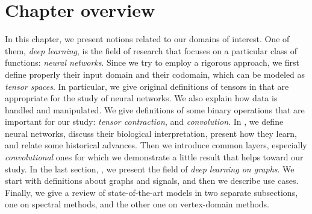 \section*{Chapter overview}

In this chapter, we present notions related to our domains of interest. One of them, \emph{deep learning}, is the field of research that focuses on a particular class of functions: \emph{neural networks}. Since we try to employ a rigorous approach, we first define properly their input domain and their codomain, which can be modeled as \emph{tensor spaces}. In particular, we give original definitions of tensors in  that are appropriate for the study of neural networks. We also explain how data is handled and manipulated. We give definitions of some binary operations that are important for our study: \emph{tensor contraction}, and \emph{convolution}. In , we define neural networks, discuss their biological interpretation, present how they learn, and relate some historical advances. Then we introduce common layers, especially \emph{convolutional} ones for which we demonstrate a little result that helps toward our study. In the last section, , we present the field of \emph{deep learning on graphs}. We start with definitions about graphs and signals, and then we describe use cases. Finally, we give a review of state-of-the-art models in two separate subsections, one on spectral methods, and the other one on vertex-domain methods.